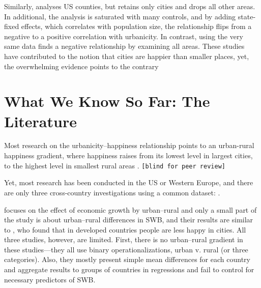 \documentclass[10pt, letterpaper]{article}
\begin{document}
Similarly, \cite{glaeser14} analyses US counties, but retains only cities and drops all other areas. In additional, the analysis is saturated with many controls, and by adding state-fixed effects, which correlates with population size, the relationship flips from a negative to a positive correlation with urbanicity. In contrast, \cite{aok_brfss_city_csize16} using the very same data finds a negative relationship by examining all areas. 
These studies have contributed to the notion that cities are happier than smaller places, yet, the overwhelming evidence points to the contrary %

\section{What We Know So Far: The Literature}

Most research on the urbanicity--happiness relationship points to an urban-rural happiness gradient, where happiness raises from its lowest level in largest cities, to the highest level in smallest rural areas
\citep[e.g.,][]{campbell76etal,aok11a, ons11, morrison11,
  aok_brfss_city_cize16,senior_ny_sep16_14,ibt13,
  morrison15,lenzi16D,aok20}. \texttt{[blind for peer review]} %

Yet, most research has been conducted in the US or Western Europe, and there are only three cross-country investigations using a common dataset: \citet{aokcities,easterlin10al,burger20}.

\citet{easterlin10al} focuses on the effect of economic growth by urban--rural and only a small part of the study is about urban--rural differences in SWB, and their results are similar to \citet{aokcities}, who found that in developed countries people are less happy in cities. All three studies, however, are limited. 
%
First, there is no urban--rural gradient in these studies---they all use binary operationalizations, urban v. rural (or three categories). Also, they mostly present simple mean differences for each country and aggregate results to groups of countries in regressions and fail to control for necessary predictors of SWB. 
\end{document}
